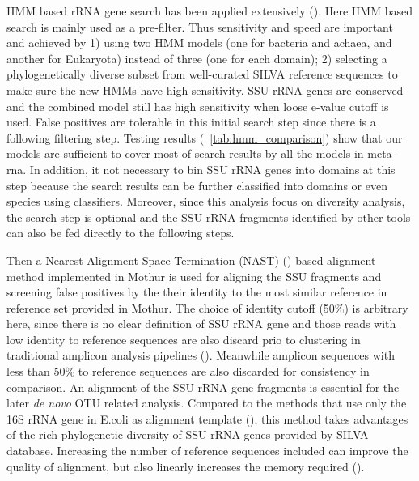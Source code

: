 \documentclass[12pt]{article}
\begin{document}
  HMM based rRNA gene search has been applied extensively (\cite{metarna,rrnaselector,metaxa}). Here HMM based search is mainly used as a pre-filter. Thus sensitivity and speed are important and achieved by 1) using two HMM models (one for bacteria and achaea, and another for Eukaryota) instead of three (one for each domain); 2) selecting a phylogenetically diverse subset from well-curated SILVA reference sequences to make sure the new HMMs have high sensitivity. SSU rRNA genes are conserved and the combined model still has high sensitivity when loose e-value cutoff is used. False positives are tolerable in this initial search step since there is a following filtering step. Testing results (~\ref{tab:hmm_comparison}) show that our models are sufficient to cover most of search results by all the models in meta-rna. In addition, it not necessary to bin SSU rRNA genes into domains at this step because the search results can be further classified into domains or even species using classifiers. Moreover, since this analysis focus on diversity analysis, the search step is optional and the SSU rRNA fragments identified by other tools can also be fed directly to the following steps.

    Then a Nearest Alignment Space Termination (NAST) (\cite{mothuraligner2009}) based alignment method implemented in Mothur is used for aligning the SSU fragments and screening false positives by the their identity to the most similar reference in reference set provided in Mothur. The choice of identity cutoff (50\%) is arbitrary here, since there is no clear definition of SSU rRNA gene and those reads with low identity to reference sequences are also discard prio to clustering in traditional amplicon analysis pipelines (\cite{rdp2009, mothur, qiime}). Meanwhile amplicon sequences with less than 50\% to reference sequences are also discarded for consistency in comparison. An alignment of the SSU rRNA gene fragments is essential for the later {\em de novo} OTU related analysis. Compared to the methods that use only the 16S rRNA gene in E.coli as alignment template (\cite{kostas2013}), this method takes advantages of the rich phylogenetic diversity of SSU rRNA genes provided by SILVA database. Increasing the number of reference sequences included can improve the quality of alignment, but also linearly increases the memory required (\cite{mothuraligner2009,pynast}).
\end{document}
